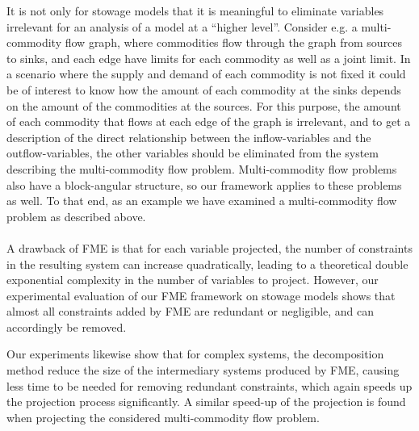 It is not only for stowage models that it is meaningful to eliminate variables irrelevant for an analysis of a model at a ``higher level''. Consider e.g. a multi-commodity flow graph, where commodities flow through the graph from sources to sinks, and each edge have limits for each commodity as well as a joint limit. In a scenario where the supply and demand of each commodity is not fixed it could be of interest to know how the amount of each commodity at the sinks depends on the amount of the commodities at the sources. For this purpose, the amount of each commodity that flows at each edge of the graph is irrelevant, and to get a description of the direct relationship between the inflow-variables and the outflow-variables, the other variables should be eliminated from the system describing the multi-commodity flow problem.
Multi-commodity flow problems also have a block-angular structure, so our framework applies to these problems as well. To that end, as an example we have examined a multi-commodity flow problem as described above. %
\\
\\
\noindent A drawback of FME is that for each variable projected, the number of constraints in the resulting system can increase quadratically, leading to a theoretical double exponential complexity in the number of variables to project. However, our experimental evaluation of our FME framework on stowage models shows that almost all constraints added by FME are redundant or negligible, and can accordingly be removed. 

Our experiments likewise show that for complex systems, the decomposition method reduce the size of the intermediary systems produced by FME, causing less time to be needed for removing redundant constraints, which again speeds up the projection process significantly. A similar speed-up of the projection is found when projecting the considered multi-commodity flow problem. %

